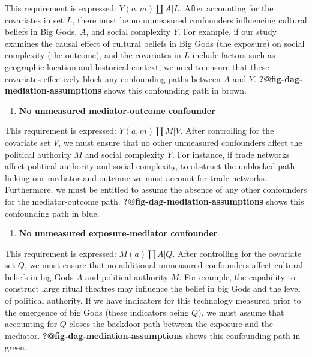 \documentclass[
  single column]{article}
\providecommand{\tightlist}{%
  \setlength{\itemsep}{0pt}\setlength{\parskip}{0pt}}\usepackage{longtable,booktabs,array}
\begin{document}
This requirement is expressed: \(Y(a,m) \coprod A | L\). After
accounting for the covariates in set \(L\), there must be no unmeasured
confounders influencing cultural beliefs in Big Gods, \(A\), and social
complexity \(Y\). For example, if our study examines the causal effect
of cultural beliefs in Big Gods (the exposure) on social complexity (the
outcome), and the covariates in \(L\) include factors such as geographic
location and historical context, we need to ensure that these covariates
effectively block any confounding paths between \(A\) and \(Y\).
\textbf{?@fig-dag-mediation-assumptions} shows this confounding path in
brown.

\begin{enumerate}
\def\labelenumi{\arabic{enumi}.}
\setcounter{enumi}{1}
\tightlist
\item
  \textbf{No unmeasured mediator-outcome confounder}
\end{enumerate}

This requirement is expressed: \(Y(a,m) \coprod M | V\). After
controlling for the covariate set \(V\), we must ensure that no other
unmeasured confounders affect the political authority \(M\) and social
complexity \(Y\). For instance, if trade networks affect political
authority and social complexity, to obstruct the unblocked path linking
our mediator and outcome we must account for trade networks.
Furthermore, we must be entitled to assume the absence of any other
confounders for the mediator-outcome path.
\textbf{?@fig-dag-mediation-assumptions} shows this confounding path in
blue.

\begin{enumerate}
\def\labelenumi{\arabic{enumi}.}
\setcounter{enumi}{2}
\tightlist
\item
  \textbf{No unmeasured exposure-mediator confounder}
\end{enumerate}

This requirement is expressed: \(M(a) \coprod A | Q\). After controlling
for the covariate set \(Q\), we must ensure that no additional
unmeasured confounders affect cultural beliefs in big Gods \(A\) and
political authority \(M\). For example, the capability to construct
large ritual theatres may influence the belief in big Gods and the level
of political authority. If we have indicators for this technology
measured prior to the emergence of big Gods (these indicators being
\(Q\)), we must assume that accounting for \(Q\) closes the backdoor
path between the exposure and the mediator.
\textbf{?@fig-dag-mediation-assumptions} shows this confounding path in
green.
\end{document}
